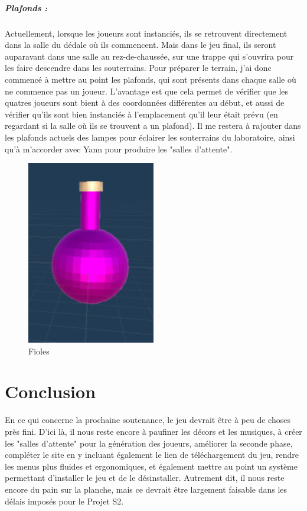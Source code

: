 \documentclass{article}
\begin{document}
\subparagraph{Plafonds :}

Actuellement, lorsque les joueurs sont instanciés, ils se retrouvent directement dans la salle du dédale où ils commencent. Mais dans le jeu final, ils seront auparavant dans une salle au rez-de-chaussée, sur une trappe qui s'ouvrira pour les faire descendre dans les souterrains. Pour préparer le terrain, j'ai donc commencé à mettre au point les plafonds, qui sont présents dans chaque salle où ne commence pas un joueur. L'avantage est que cela permet de vérifier que les quatres joueurs sont bient à des coordonnées différentes au début, et aussi de vérifier qu'ils sont bien instanciés à l'emplacement qu'il leur était prévu (en regardant si la salle où ils se trouvent a un plafond). Il me restera à rajouter dans les plafonds actuels des lampes pour éclairer les souterrains du laboratoire, ainsi qu'à m'accorder avec Yann pour produire les "salles d'attente".

\par\vspace{0.5cm}
\begin{figure}[!ht]
    \centering
    \includegraphics[width=0.5\textwidth]{Fioles.PNG}
    \caption{Fioles}
    \label{Fioles}
\end{figure}{}

\section{Conclusion}

En ce qui concerne la prochaine soutenance, le jeu devrait être à peu de choses près fini. D'ici là, il nous reste encore à paufiner les décors et les musiques, à créer les "salles d'attente" pour la génération des joueurs, améliorer la seconde phase, compléter le site en y incluant également le lien de téléchargement du jeu, rendre les menus plus fluides et ergonomiques, et également mettre au point un système permettant d'installer le jeu et de le désinstaller. Autrement dit, il nous reste encore du pain sur la planche, mais ce devrait être largement faisable dans les délais imposés pour le Projet S2.

\end{document}
